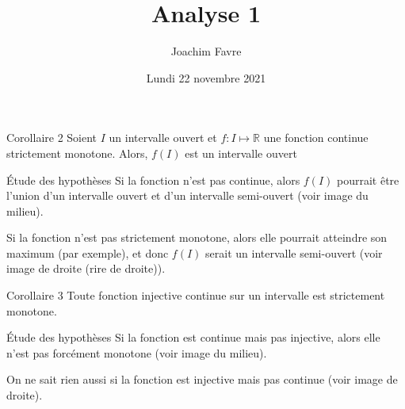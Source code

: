 \documentclass[a4paper]{article}
\title{Analyse 1}
\author{Joachim Favre}
\date{Lundi 22 novembre 2021}
\begin{document}
\maketitle



\begin{parag}{Corollaire 2}
    Soient $I$ un intervalle ouvert et $f : I \mapsto \mathbb{R}$ une fonction continue strictement monotone. Alors, $f\left(I\right)$ est un intervalle ouvert


    \begin{subparag}{Étude des hypothèses}
        Si la fonction n'est pas continue, alors $f\left(I\right)$ pourrait être l'union d'un intervalle ouvert et d'un intervalle semi-ouvert (voir image du milieu).


        Si la fonction n'est pas strictement monotone, alors elle pourrait atteindre son maximum (par exemple), et donc $f\left(I\right)$ serait un intervalle semi-ouvert (voir image de droite (rire de droite)).
    \end{subparag}
\end{parag}

\begin{parag}{Corollaire 3}
    Toute fonction injective continue sur un intervalle est strictement monotone.


    \begin{subparag}{Étude des hypothèses}
        Si la fonction est continue mais pas injective, alors elle n'est pas forcément monotone (voir image du milieu).

        On ne sait rien aussi si la fonction est injective mais pas continue (voir image de droite).
    \end{subparag}
\end{parag}
\end{document}
